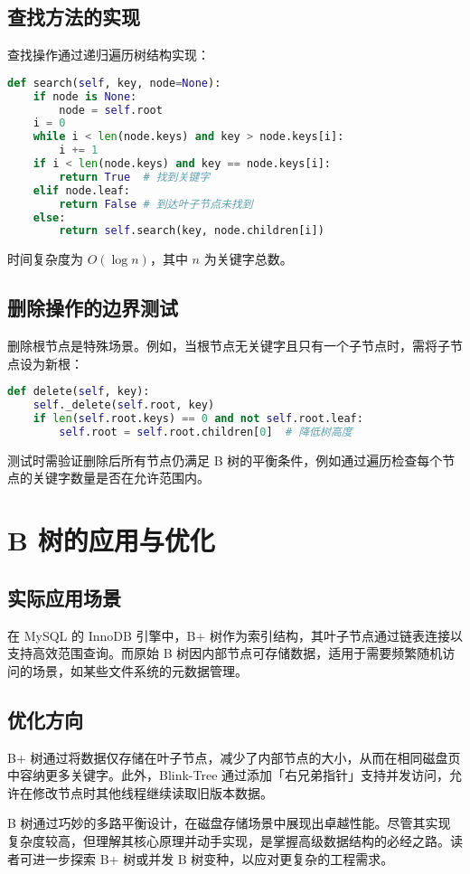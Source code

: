 \section{查找方法的实现}
查找操作通过递归遍历树结构实现：\par
\begin{lstlisting}[language=python]
def search(self, key, node=None):
    if node is None:
        node = self.root
    i = 0
    while i < len(node.keys) and key > node.keys[i]:
        i += 1
    if i < len(node.keys) and key == node.keys[i]:
        return True  # 找到关键字
    elif node.leaf:
        return False # 到达叶子节点未找到
    else:
        return self.search(key, node.children[i])
\end{lstlisting}
时间复杂度为 $O(\log n)$，其中 $n$ 为关键字总数。\par
\section{删除操作的边界测试}
删除根节点是特殊场景。例如，当根节点无关键字且只有一个子节点时，需将子节点设为新根：\par
\begin{lstlisting}[language=python]
def delete(self, key):
    self._delete(self.root, key)
    if len(self.root.keys) == 0 and not self.root.leaf:
        self.root = self.root.children[0]  # 降低树高度
\end{lstlisting}
测试时需验证删除后所有节点仍满足 B 树的平衡条件，例如通过遍历检查每个节点的关键字数量是否在允许范围内。\par
\chapter{B 树的应用与优化}
\section{实际应用场景}
在 MySQL 的 InnoDB 引擎中，B+ 树作为索引结构，其叶子节点通过链表连接以支持高效范围查询。而原始 B 树因内部节点可存储数据，适用于需要频繁随机访问的场景，如某些文件系统的元数据管理。\par
\section{优化方向}
B+ 树通过将数据仅存储在叶子节点，减少了内部节点的大小，从而在相同磁盘页中容纳更多关键字。此外，Blink-Tree 通过添加「右兄弟指针」支持并发访问，允许在修改节点时其他线程继续读取旧版本数据。\par
B 树通过巧妙的多路平衡设计，在磁盘存储场景中展现出卓越性能。尽管其实现复杂度较高，但理解其核心原理并动手实现，是掌握高级数据结构的必经之路。读者可进一步探索 B+ 树或并发 B 树变种，以应对更复杂的工程需求。\par
